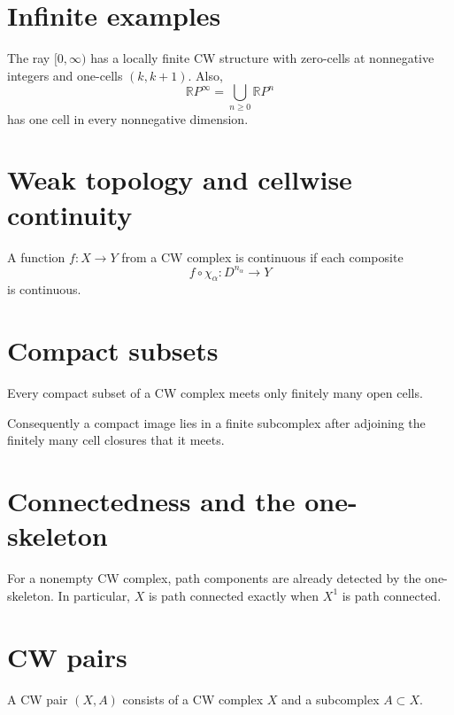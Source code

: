 \section{Infinite examples}
The ray \([0,\infty)\) has a locally finite CW structure with zero-cells at
nonnegative integers and one-cells \((k,k+1)\).  Also,
\[
\mathbb RP^\infty=\bigcup_{n\ge0}\mathbb RP^n
\]
has one cell in every nonnegative dimension.

\section{Weak topology and cellwise continuity}
\begin{proposition}\label{prop:viii06-cellwise}
A function \(f:X\to Y\) from a CW complex is continuous if each composite
\[
f\circ\chi_\alpha:D^{n_\alpha}\to Y
\]
is continuous.
\end{proposition}

\section{Compact subsets}
\begin{theorem}\label{thm:viii06-compact-cells}
Every compact subset of a CW complex meets only finitely many open cells.
\end{theorem}

Consequently a compact image lies in a finite subcomplex after adjoining the
finitely many cell closures that it meets.

\section{Connectedness and the one-skeleton}
\begin{proposition}\label{prop:viii06-connected}
For a nonempty CW complex, path components are already detected by the
one-skeleton.  In particular, \(X\) is path connected exactly when \(X^1\) is
path connected.
\end{proposition}

\section{CW pairs}
\begin{definition}[CW pair]\label{def:viii06-pair}
A CW pair \((X,A)\) consists of a CW complex \(X\) and a subcomplex \(A\subset X\).
\end{definition}

